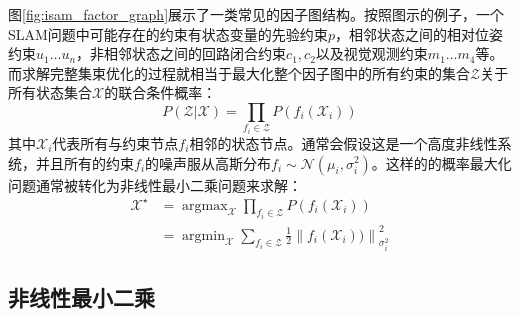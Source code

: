 图\ref{fig:isam_factor_graph}展示了一类常见的因子图结构。按照图示的例子，一个SLAM问题中可能存在的约束有状态变量的先验约束$p$，相邻状态之间的相对位姿约束$u_1 \dots u_n$，非相邻状态之间的回路闭合约束$c_1,c_2$以及视觉观测约束$m_1 \dots m_4$等。而求解完整集束优化的过程就相当于最大化整个因子图中的所有约束的集合$\mathcal{Z}$关于所有状态集合$\mathcal{X}$的联合条件概率：
\begin{equation}
    P(\mathcal{Z}|\mathcal{X}) = \prod_{f_i\in\mathcal{Z}} P(f_i(\mathcal{X}_i))
\end{equation}
其中$\mathcal{X}_i$代表所有与约束节点$f_i$相邻的状态节点。通常会假设这是一个高度非线性系统，并且所有的约束$f_i$的噪声服从高斯分布$f_i\sim\mathcal{N}(\mu_i, \sigma_i^2)$。这样的的概率最大化问题通常被转化为非线性最小二乘问题来求解：
\begin{equation}
\begin{aligned}
    \mathcal{X}^\star &= \mathop{\arg\max}_{\mathcal{X}}
                         \prod_{f_i\in\mathcal{Z}} P(f_i(\mathcal{X}_i)) \\
                      &= \mathop{\arg\min}_{\mathcal{X}}
                         \sum_{f_i\in\mathcal{Z}} \tfrac{1}{2}
                         \left\| f_i(\mathcal{X}_i)) \right\|_{\sigma_i^2}^2
\end{aligned}
\end{equation}

\subsection{非线性最小二乘}

